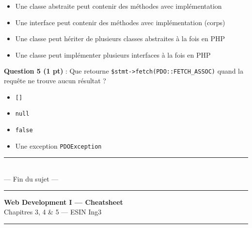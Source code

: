 \documentclass[11pt,a4paper]{article}
\newcommand{\cb}{$\square$\ }
\begin{document}
\begin{itemize}[leftmargin=2em, itemsep=3pt, topsep=4pt]
  \item[\cb] Une classe abstraite peut contenir des méthodes avec implémentation
  \item[\cb] Une interface peut contenir des méthodes avec implémentation (corps)
  \item[\cb] Une classe peut hériter de plusieurs classes abstraites à la fois en PHP
  \item[\cb] Une classe peut implémenter plusieurs interfaces à la fois en PHP
\end{itemize}

\vspace{6pt}

\noindent\textbf{Question 5 (1 pt)} : Que retourne \texttt{\$stmt->fetch(PDO::FETCH\_ASSOC)} quand la requête ne trouve aucun résultat ?

\begin{itemize}[leftmargin=2em, itemsep=3pt, topsep=4pt]
  \item[\cb] \texttt{[]}
  \item[\cb] \texttt{null}
  \item[\cb] \texttt{false}
  \item[\cb] Une exception \texttt{PDOException}
\end{itemize}

\vspace{10pt}
\begin{center}
  \rule{6cm}{0.4pt}\\[4pt]
  {\large --- Fin du sujet ---}\\
  \rule{6cm}{0.4pt}
\end{center}

\newpage

\thispagestyle{fancy}
\begin{center}
  {\LARGE\bfseries Web Development I --- Cheatsheet}\\[2pt]
  {\normalsize Chapitres 3, 4 \& 5 --- ESIN Ing3}
\end{center}

\vspace{6pt}
\noindent\rule{\linewidth}{0.8pt}
\vspace{4pt}
\end{document}
